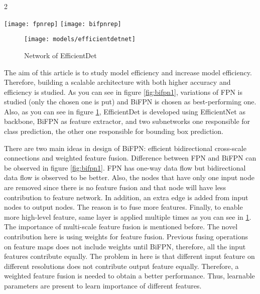 \documentclass{article}
\begin{document}
\setlength{\parindent}{6ex}


\begin{multicols}{2}
    \begin{figure*}[ht!]
        \texttt{[image: fpnrep]}\hfill
        \texttt{[image: bifpnrep]}
        \caption{FPN (left) and BiFPN (right)}
        \label{fig:bifpn1}
    \end{figure*}
\end{multicols}

\begin{figure}
    \centering
    \texttt{[image: models/efficientdetnet]}
    \caption{Network of EfficientDet}
    \label{fig:efficientdetnet1}
\end{figure}

\indent

The aim of this article is to study model efficiency and increase model 
efficiency. Therefore, building a scalable architecture with both higher 
accuracy and efficiency \cite{efficientdetcite} is studied. As you can see in figure 
\ref{fig:bifpn1}, variations of FPN is studied (only the chosen one is 
put) and BiFPN is chosen as best-performing one. Also, as you can see 
in figure \ref{fig:efficientdetnet1}, EfficientDet is developed using 
EfficientNet as backbone, BiFPN as feature extractor, and two subnetworks 
one responsible for class prediction, the other one responsible for bounding 
box prediction. \par

There are two main ideas in design of BiFPN: efficient bidirectional 
cross-scale connections and weighted feature fusion. Difference between 
FPN and BiFPN can be observed in figure \ref{fig:bifpn1}. FPN has one-way 
data flow but bidirectional data flow is observed to be better. Also, 
the nodes that have only one input node are removed since there is no 
feature fusion and that node will have less contribution to feature network. 
In addition, an extra edge is added from input nodes to output nodes. The 
reason is to fuse more features. Finally, to enable more high-level feature, 
same layer is applied multiple times as you can see in \ref{fig:efficientdetnet1}.
The importance of multi-scale feature fusion is mentioned before. The novel contribution 
here is using weights for feature fusion. Previous fusing operations 
on feature maps does not include weights until BiFPN, therefore, all the 
input features contribute equally. The problem in here is that different 
input feature on different resolutions does not contribute output feature 
equally. Therefore, a weighted feature fusion is needed to obtain a better 
performance. Thus, learnable parameters are present to learn importance 
of different features. \par
\end{document}
